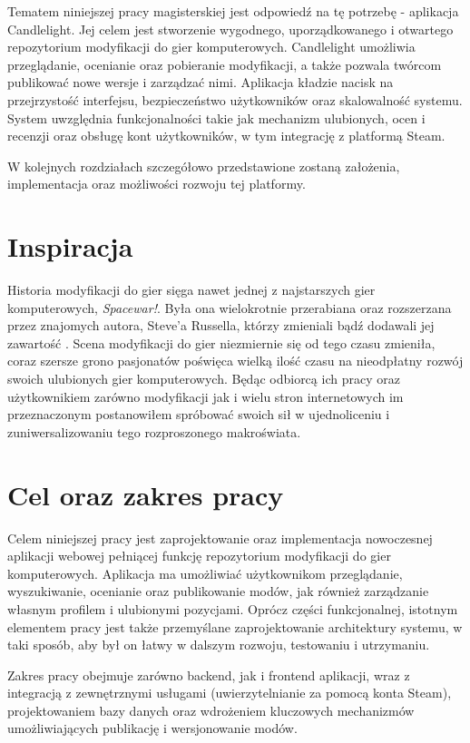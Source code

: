 \documentclass[a4paper,twoside,12pt]{book}
\begin{document}
Tematem niniejszej pracy magisterskiej jest odpowiedź na tę potrzebę - aplikacja Candlelight. Jej celem jest stworzenie wygodnego, uporządkowanego i otwartego repozytorium modyfikacji do gier komputerowych. Candlelight umożliwia przeglądanie, ocenianie oraz pobieranie modyfikacji, a także pozwala twórcom publikować nowe wersje i zarządzać nimi. Aplikacja kładzie nacisk na przejrzystość interfejsu, bezpieczeństwo użytkowników oraz skalowalność systemu. System uwzględnia funkcjonalności takie jak mechanizm ulubionych, ocen i recenzji oraz obsługę kont użytkowników, w tym integrację z platformą Steam.

W kolejnych rozdziałach szczegółowo przedstawione zostaną założenia, implementacja oraz możliwości rozwoju tej platformy.

\section{Inspiracja}

Historia modyfikacji do gier sięga nawet jednej z najstarszych gier komputerowych, \textit{Spacewar!}. Była ona wielokrotnie przerabiana oraz rozszerzana przez znajomych autora, Steve'a Russella, którzy zmieniali bądź dodawali jej zawartość \cite{kluska2008}. Scena modyfikacji do gier niezmiernie się od tego czasu zmieniła, coraz szersze grono pasjonatów poświęca wielką ilość czasu na nieodpłatny rozwój swoich ulubionych gier komputerowych. Będąc odbiorcą ich pracy oraz użytkownikiem zarówno modyfikacji jak i wielu stron internetowych im przeznaczonym postanowiłem spróbować swoich sił w ujednoliceniu i zuniwersalizowaniu tego rozproszonego makroświata. 

\section{Cel oraz zakres pracy}

Celem niniejszej pracy jest zaprojektowanie oraz implementacja nowoczesnej aplikacji webowej pełniącej funkcję repozytorium modyfikacji do gier komputerowych. Aplikacja ma umożliwiać użytkownikom przeglądanie, wyszukiwanie, ocenianie oraz publikowanie modów, jak również zarządzanie własnym profilem i ulubionymi pozycjami. Oprócz części funkcjonalnej, istotnym elementem pracy jest także przemyślane zaprojektowanie architektury systemu, w taki sposób, aby był on łatwy w dalszym rozwoju, testowaniu i utrzymaniu.

Zakres pracy obejmuje zarówno backend, jak i frontend aplikacji, wraz z integracją z zewnętrznymi usługami (uwierzytelnianie za pomocą konta Steam), projektowaniem bazy danych oraz wdrożeniem kluczowych mechanizmów umożliwiających publikację i wersjonowanie modów.
\end{document}
